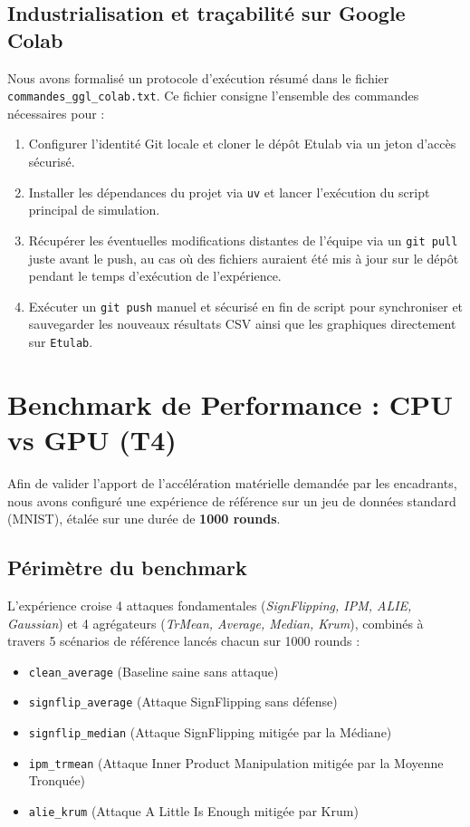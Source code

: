 \documentclass[11pt, a4paper]{article}
\begin{document}
\subsection{Industrialisation et traçabilité sur Google Colab}
Nous avons formalisé un protocole d'exécution résumé dans le fichier \texttt{commandes\_ggl\_colab.txt}. Ce fichier consigne l'ensemble des commandes nécessaires pour :
\begin{enumerate}
    \item Configurer l'identité Git locale et cloner le dépôt Etulab via un jeton d'accès sécurisé.
    \item Installer les dépendances du projet via \texttt{uv} et lancer l'exécution du script principal de simulation.
     \item Récupérer les éventuelles modifications distantes de l'équipe via un \texttt{git pull} juste avant le push, au cas où des fichiers auraient été mis à jour sur le dépôt pendant le temps d'exécution de l'expérience.
    \item Exécuter un \texttt{git push} manuel et sécurisé en fin de script pour synchroniser et sauvegarder les nouveaux résultats CSV ainsi que les graphiques directement sur \texttt{Etulab}.
\end{enumerate}

\section{Benchmark de Performance : CPU vs GPU (T4)}
Afin de valider l'apport de l'accélération matérielle demandée par les encadrants, nous avons configuré une expérience de référence sur un jeu de données standard (MNIST), étalée sur une durée de \textbf{1000 rounds}.

\subsection{Périmètre du benchmark}
L'expérience croise 4 attaques fondamentales (\textit{SignFlipping, IPM, ALIE, Gaussian}) et 4 agrégateurs (\textit{TrMean, Average, Median, Krum}), combinés à travers 5 scénarios de référence lancés chacun sur 1000 rounds :
\begin{itemize}
    \item \texttt{clean\_average} (Baseline saine sans attaque)
    \item \texttt{signflip\_average} (Attaque SignFlipping sans défense)
    \item \texttt{signflip\_median} (Attaque SignFlipping mitigée par la Médiane)
    \item \texttt{ipm\_trmean} (Attaque Inner Product Manipulation mitigée par la Moyenne Tronquée)
    \item \texttt{alie\_krum} (Attaque A Little Is Enough mitigée par Krum)
\end{itemize}
\end{document}
